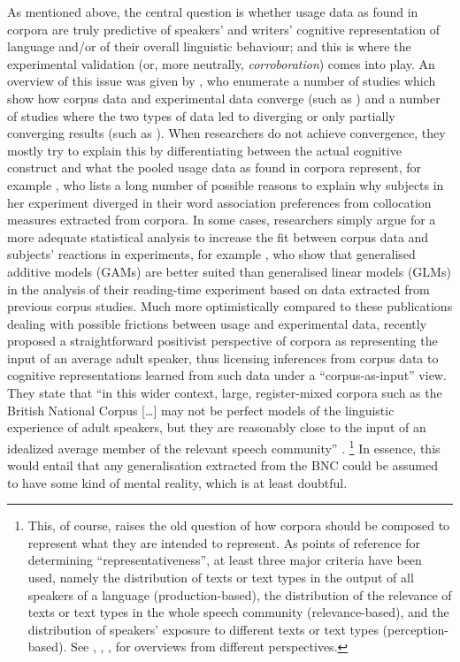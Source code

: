 As mentioned above, the central question is whether usage data as found in corpora are truly predictive of speakers' and writers' cognitive representation of language and\slash or of their overall linguistic behaviour; and this is where the experimental validation (or, more neutrally, \textit{corroboration}) comes into play.
An overview of this issue was given by \cite{NewmanSorensenduncan2015}, who enumerate a number of studies which show how corpus data and experimental data converge (such as \citealp{BresnanEa2007,DurrantDoherty2010,GriesWulff2005,GriesEa2005}) and a number of studies where the two types of data led to diverging or only partially converging results (such as \citealp{ArppeJaervikivi2007,Dabrowska2014,Mollin2009}).
When researchers do not achieve convergence, they mostly try to explain this by differentiating between the actual cognitive construct and what the pooled usage data as found in corpora represent, for example \citet[411]{Dabrowska2014}, who lists a long number of possible reasons to explain why subjects in her experiment diverged in their word association preferences from collocation measures extracted from corpora.
In some cases, researchers simply argue for a more adequate statistical analysis to increase the fit between corpus data and subjects' reactions in experiments, for example \cite{DivjakEa2016}, who show that generalised additive models (GAMs) are better suited than generalised linear models (GLMs) in the analysis of their reading-time experiment based on data extracted from previous corpus studies.
Much more optimistically compared to these publications dealing with possible frictions between usage and experimental data, \cite{StefanowitschFlach2016} recently proposed a straightforward positivist perspective of corpora as representing the input of an average adult speaker, thus licensing inferences from corpus data to cognitive representations learned from such data under a ``corpus-as-input'' view.
They state that ``in this wider context, large, register-mixed corpora such as the British National Corpus [\ldots] may not be perfect models of the linguistic experience of adult speakers, but they are reasonably close to the input of an idealized average member of the relevant speech community'' \citep[104]{StefanowitschFlach2016}.%
\footnote{This, of course, raises the old question of how corpora should be composed to represent what they are intended to represent.
As points of reference for determining ``representativeness'', at least three major criteria have been used, namely the distribution of texts or text types in the output of all speakers of a language (production-based), the distribution of the relevance of texts or text types in the whole speech community (relevance-based), and the distribution of speakers' exposure to different texts or text types (perception-based).
See \citet{Biber1993}, \citet{MceneryEa2006}, \citet{Leech2007}, \citet{Hunston2008} for overviews from different perspectives.}
In essence, this would entail that any generalisation extracted from the BNC could be assumed to have some kind of mental reality, which is at least doubtful.

